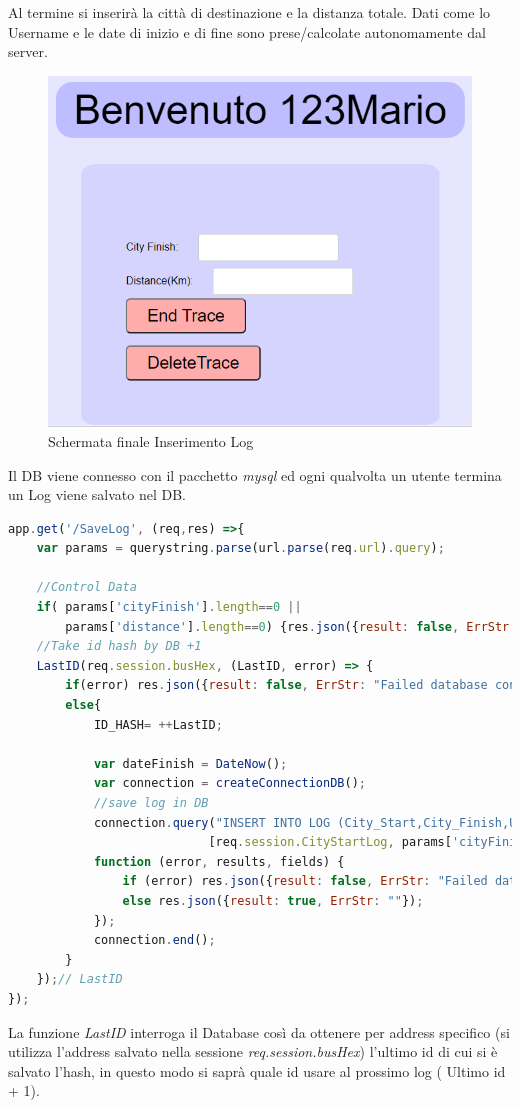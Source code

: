 \documentclass[11pt,a4paper,titlepage]{report}
\begin{document}
Al termine si inserirà la città di destinazione e la distanza totale. Dati come lo Username e le date di inizio e di fine sono prese/calcolate autonomamente dal server.
\begin{figure}[h]
	\includegraphics[width=\textwidth]{End_Log}
	\centering
	\caption{Schermata finale Inserimento Log}
	\label{fig:End_Log}
\end{figure}
Il DB viene connesso con il pacchetto \textit{mysql} ed ogni qualvolta un utente termina un Log viene salvato nel DB.
\begin{lstlisting}[language=JavaScript]
app.get('/SaveLog', (req,res) =>{
	var params = querystring.parse(url.parse(req.url).query);

	//Control Data
	if( params['cityFinish'].length==0 ||
		params['distance'].length==0) {res.json({result: false, ErrStr: "Campo/i Mancante"});return;}
	//Take id hash by DB +1
	LastID(req.session.busHex, (LastID, error) => {
		if(error) res.json({result: false, ErrStr: "Failed database connection " + error});
		else{
	  		ID_HASH= ++LastID;

	  		var dateFinish = DateNow();
	  		var connection = createConnectionDB();
		  	//save log in DB
		  	connection.query("INSERT INTO LOG (City_Start,City_Finish,UserName,Distance,DataStart,DataFinish,ID_HASH) VALUES(?,?,?,?,?,?,?)",
		  					[req.session.CityStartLog, params['cityFinish'], req.session.username, params['distance'], req.session.DateStartLog, dateFinish, ID_HASH ],
		  	function (error, results, fields) {
		  		if (error) res.json({result: false, ErrStr: "Failed database connection " + error});
		  		else res.json({result: true, ErrStr: ""});
			});
			connection.end();
	  	}
	});// LastID
});
\end{lstlisting}
La funzione \textit{LastID} interroga il Database così da ottenere per address specifico (si utilizza l'address salvato nella sessione \textit{req.session.busHex}) l'ultimo id di cui si è salvato l'hash, in questo modo si saprà quale id usare al prossimo log ( Ultimo id + 1).
\end{document}
